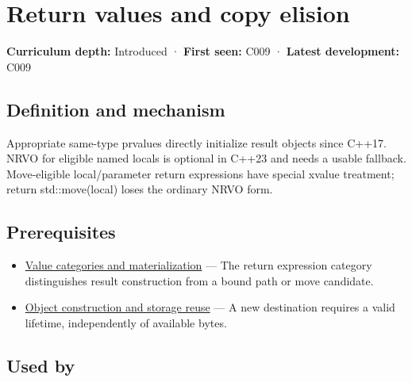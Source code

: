 \hypertarget{appendix-b08d3788c5c6}{}\label{referencestart:appendix-b08d3788c5c6}
\section{Return values and copy elision}\label{appendix-b08d3788c5c6-return-values-and-copy-elision}

\hypertarget{appendix-b08d3788c5c6-return-values-and-copy-elision}{}

\textbf{Curriculum depth:} Introduced · \textbf{First seen:} C009 · \textbf{Latest development:} C009

\begin{allmightroledefinition}

\subsection{Definition and mechanism}\label{appendix-b08d3788c5c6-definition-and-mechanism}

\hypertarget{appendix-b08d3788c5c6-definition-and-mechanism}{}

Appropriate same-type prvalues directly initialize result objects since C++17. NRVO for eligible named locals is optional in C++23 and needs a usable fallback. Move-eligible local/parameter return expressions have special xvalue treatment; return std::move(local) loses the ordinary NRVO form.

\end{allmightroledefinition}

\subsection{Prerequisites}\label{appendix-b08d3788c5c6-prerequisites}

\hypertarget{appendix-b08d3788c5c6-prerequisites}{}

\begin{itemize}
\tightlist
\item
  \hyperref[appendix-1121b30eaeb0]{Value categories and materialization} --- The return expression category distinguishes result construction from a bound path or move candidate.
\item
  \hyperref[appendix-a82f9c438857]{Object construction and storage reuse} --- A new destination requires a valid lifetime, independently of available bytes.
\end{itemize}

\subsection{Used by}\label{appendix-b08d3788c5c6-used-by}

